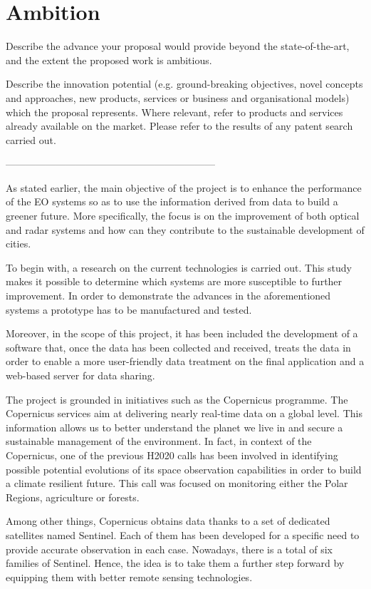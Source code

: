 \section{Ambition}

Describe the advance your proposal would provide beyond the state-of-the-art, and the extent the proposed work is ambitious.

Describe the innovation potential (e.g. ground-breaking objectives, novel concepts and approaches, new products, services or business and organisational models) which the proposal represents. Where relevant, refer to products and services already available on the market. Please refer to the results of any patent search carried out.

---------------------------------------------------------------

As stated earlier, the main objective of the project is to enhance the performance of the EO systems so as to use the information derived from data to build a greener future. More specifically, the focus is on the improvement of both optical and radar systems and how can they contribute to the sustainable development of cities. 

To begin with, a research on the current technologies is carried out. This study makes it possible to determine which systems are more susceptible to further improvement. In order to demonstrate the advances in the aforementioned systems a prototype has to be manufactured and tested. 

Moreover, in the scope of this project, it has been included the development of a software that, once the data has been collected and received, treats the data in order to enable a more user-friendly data treatment on the final application and a web-based server for data sharing.

The project is grounded in initiatives such as the Copernicus programme. The Copernicus services aim at delivering nearly real-time data on a global level. This information allows us to better understand the planet we live in and secure a sustainable management of the environment. In fact, in context of the Copernicus, one of the previous H2020 calls has been involved in identifying possible potential evolutions of its space observation capabilities in order to build a climate resilient future. This call was focused on monitoring either the Polar Regions, agriculture or forests.

Among other things, Copernicus obtains data thanks to a set of dedicated satellites named Sentinel. Each of them has been developed for a specific need to provide accurate observation in each case. Nowadays, there is a total of six families of Sentinel. Hence, the idea is to take them a further step forward by equipping them with better remote sensing technologies. 